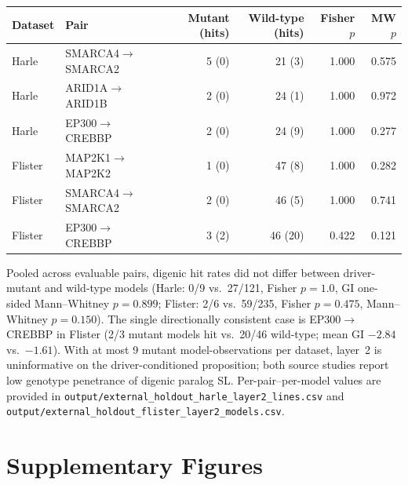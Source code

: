 \documentclass[11pt,a4paper]{article}
\begin{document}
\begin{center}
\small
\begin{tabular}{llrrrr}
\toprule
Dataset & Pair & Mutant (hits) & Wild-type (hits) & Fisher $p$ & MW $p$ \\
\midrule
Harle & SMARCA4$\rightarrow$SMARCA2 & 5 (0) & 21 (3) & 1.000 & 0.575 \\
Harle & ARID1A$\rightarrow$ARID1B & 2 (0) & 24 (1) & 1.000 & 0.972 \\
Harle & EP300$\rightarrow$CREBBP & 2 (0) & 24 (9) & 1.000 & 0.277 \\
Flister & MAP2K1$\rightarrow$MAP2K2 & 1 (0) & 47 (8) & 1.000 & 0.282 \\
Flister & SMARCA4$\rightarrow$SMARCA2 & 2 (0) & 46 (5) & 1.000 & 0.741 \\
Flister & EP300$\rightarrow$CREBBP & 3 (2) & 46 (20) & 0.422 & 0.121 \\
\bottomrule
\end{tabular}
\end{center}

\noindent Pooled across evaluable pairs, digenic hit rates did not differ between driver-mutant and wild-type models (Harle: 0/9 vs.\ 27/121, Fisher $p=1.0$, GI one-sided Mann--Whitney $p=0.899$; Flister: 2/6 vs.\ 59/235, Fisher $p=0.475$, Mann--Whitney $p=0.150$). The single directionally consistent case is EP300$\rightarrow$CREBBP in Flister (2/3 mutant models hit vs.\ 20/46 wild-type; mean GI $-2.84$ vs.\ $-1.61$). With at most 9 mutant model-observations per dataset, layer~2 is uninformative on the driver-conditioned proposition; both source studies report low genotype penetrance of digenic paralog SL. Per-pair--per-model values are provided in \texttt{output/external\_holdout\_harle\_layer2\_lines.csv} and \texttt{output/external\_holdout\_flister\_layer2\_models.csv}.

\newpage
\section{Supplementary Figures}
\end{document}
